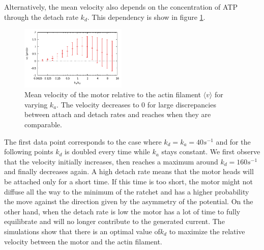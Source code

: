 \documentclass[aps,pre,twocolumn,showpacs,showkeys,a4paper]{revtex4}
\begin{document}
Alternatively, the mean velocity also depends on the concentration of ATP through the detach rate $k_{d}$. 
This dependency is show in figure \ref{Fig: v_k}.
\begin{figure}[t]
\centering
\includegraphics[width=0.45\textwidth,height=!]{v_k}
\caption{Mean velocity of the motor relative to the actin filament $\langle v \rangle$ for varying $k_{a}$.
The velocity decreases to $0$ for large discrepancies between attach and detach rates and reaches when they are comparable.
}
\label{Fig: v_k} 
\end{figure}
The first data point corresponds to the case where $k_{d} = k_{a} = 40 s^{-1}$ and for the following points $k_{d}$ is doubled every time while $k_{a}$ stays constant. 
We first observe that the velocity initially increases, then reaches a maximum around $k_{d} = 160 s^{-1}$ and finally decreases again. 
A high detach rate means that the motor heads will be attached only for a short time. 
If this time is too short, the motor might not diffuse all the way to the minimum of the ratchet and has a higher probability the move against the direction given by the asymmetry of the potential. 
On the other hand, when the detach rate is low the motor has a lot of time to fully equilibrate and will no longer contribute to the generated current. 
The simulations show that there is an optimal value of$k_{d}$ to maximize the relative velocity between the motor and the actin filament. 
\end{document}
